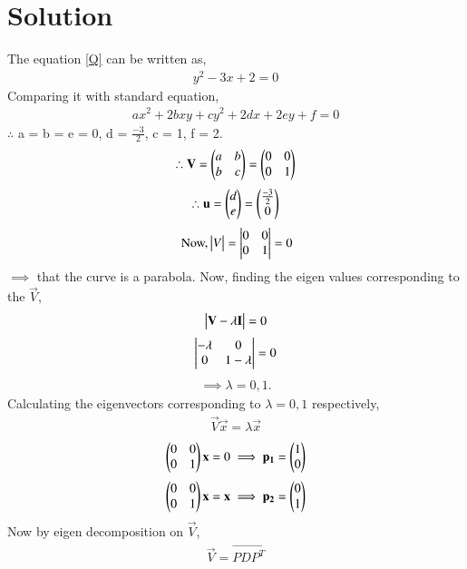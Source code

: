\documentclass[journal,12pt,twocolumn]{IEEEtran}
\begin{document}
\section{Solution}
The equation \eqref{Q} can be written as,
\begin{align}
y^2-3x+2 = 0
\end{align}
Comparing it with standard equation,
\begin{align}
ax^2+2bxy+cy^2+2dx+2ey+f = 0
\end{align}
$\therefore$ a = b = e = 0, d = $\frac{-3}{2}$, c = 1, f = 2.
\begin{align}
\therefore \mathbf{V} = \begin{pmatrix}a&b\\b&c\end{pmatrix} = \begin{pmatrix}0&0\\0&1\end{pmatrix}
\end{align} 
\begin{align}
\therefore\mathbf{u} = \begin{pmatrix}d\\e\end{pmatrix} = \begin{pmatrix}\frac{-3}{2}\\0\end{pmatrix}\label{u}
\end{align}
\begin{align}
 \mbox{ Now,} \begin{vmatrix}V\end{vmatrix} = \begin{vmatrix}0&0\\0&1\end{vmatrix} = 0
\end{align}
$\implies$ that the curve is a parabola. Now, finding the eigen values corresponding to the $\vec{V}$,
\begin{align}
\begin{vmatrix}\mathbf{V}-\lambda\mathbf{I}\end{vmatrix} = 0
\end{align}
\begin{align}
\begin{vmatrix}-\lambda&0\\0&1-\lambda\end{vmatrix} = 0
\end{align}
\begin{align}
\implies \lambda = 0,1.
\end{align}
Calculating the eigenvectors corresponding to $\lambda = 0,1$ respectively,
\begin{align}
\vec{V}\vec{x} = \lambda\vec{x}
\end{align}
\begin{align}
\begin{pmatrix}0&0\\0&1\end{pmatrix}\mathbf{x} = 0 \implies \mathbf{p_1} = \begin{pmatrix}1\\0\end{pmatrix}
\end{align}
\begin{align}
\begin{pmatrix}0&0\\0&1\end{pmatrix}\mathbf{x} = \mathbf{x} \implies \mathbf{p_2} = \begin{pmatrix}0\\1\end{pmatrix}
\end{align}
Now by eigen decomposition on $\vec{V}$,
\begin{align}
\vec{V} = \vec{PDP^T}
\label{V}
\end{align}
\end{document}

